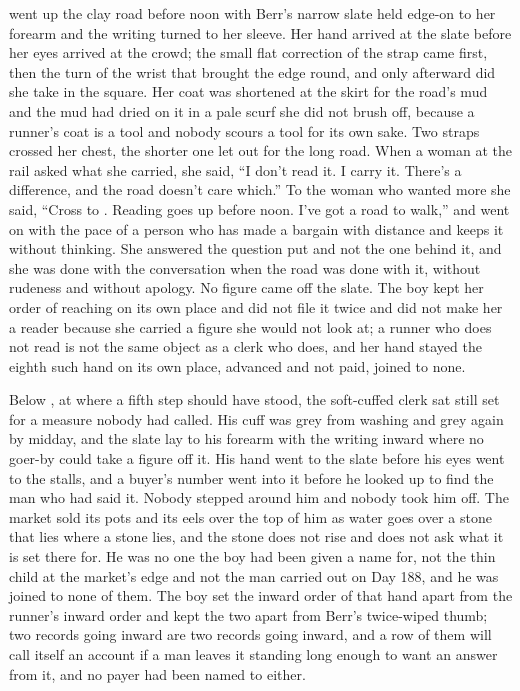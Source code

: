  went up the clay road before noon with Berr's narrow slate held edge-on to her forearm and the writing turned to her sleeve. Her hand arrived at the slate before her eyes arrived at the crowd; the small flat correction of the strap came first, then the turn of the wrist that brought the edge round, and only afterward did she take in the square. Her coat was shortened at the skirt for the road's mud and the mud had dried on it in a pale scurf she did not brush off, because a runner's coat is a tool and nobody scours a tool for its own sake. Two straps crossed her chest, the shorter one let out for the long road. When a woman at the rail asked what she carried, she said, “I don't read it. I carry it. There's a difference, and the road doesn't care which.” To the woman who wanted more she said, “Cross to . Reading goes up before noon. I've got a road to walk,” and went on with the pace of a person who has made a bargain with distance and keeps it without thinking. She answered the question put and not the one behind it, and she was done with the conversation when the road was done with it, without rudeness and without apology. No figure came off the slate. The boy kept her order of reaching on its own place and did not file it twice and did not make her a reader because she carried a figure she would not look at; a runner who does not read is not the same object as a clerk who does, and her hand stayed the eighth such hand on its own place, advanced and not paid, joined to none.

Below , at  where a fifth step should have stood, the soft-cuffed clerk sat still set for a measure nobody had called. His cuff was grey from washing and grey again by midday, and the slate lay to his forearm with the writing inward where no goer-by could take a figure off it. His hand went to the slate before his eyes went to the stalls, and a buyer's number went into it before he looked up to find the man who had said it. Nobody stepped around him and nobody took him off. The market sold its pots and its eels over the top of him as water goes over a stone that lies where a stone lies, and the stone does not rise and does not ask what it is set there for. He was no one the boy had been given a name for, not the thin child at the market's edge and not the man carried out on Day 188, and he was joined to none of them. The boy set the inward order of that hand apart from the runner's inward order and kept the two apart from Berr's twice-wiped thumb; two records going inward are two records going inward, and a row of them will call itself an account if a man leaves it standing long enough to want an answer from it, and no payer had been named to either.

